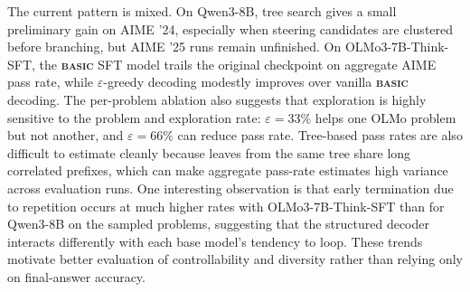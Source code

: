 \documentclass[10pt,twocolumn]{article}
\newcommand{\methodname}{\textbf{\textsf{\textsc{basic}}}}
\newcommand{\methodname}{{\sffamily\bfseries{\fontsize{0.95em}{0.95em}\selectfont BASIC}}}
\begin{document}
The current pattern is mixed. On Qwen3-8B, tree search gives a small preliminary
gain on AIME '24, especially when steering candidates are clustered before
branching, but AIME '25 runs remain unfinished. On OLMo3-7B-Think-SFT, the
\methodname{} SFT model trails the original checkpoint on aggregate AIME
pass rate, while \(\varepsilon\)-greedy decoding modestly improves over vanilla
\methodname{} decoding. The per-problem ablation also suggests that
exploration is highly sensitive to the problem and exploration rate:
\(\varepsilon=33\%\) helps one OLMo problem but not another, and \(\varepsilon=66\%\)
can reduce pass rate. Tree-based pass rates are also difficult to estimate
cleanly because leaves from the same tree share long correlated prefixes, which
can make aggregate pass-rate estimates high variance across evaluation runs. One
interesting observation is that early termination due to repetition occurs at much
higher rates with
OLMo3-7B-Think-SFT than for Qwen3-8B on the sampled problems, suggesting that
the structured decoder interacts differently with each base model's tendency to
loop. These trends motivate better evaluation of controllability and diversity
rather than relying only on final-answer accuracy.
\end{document}
